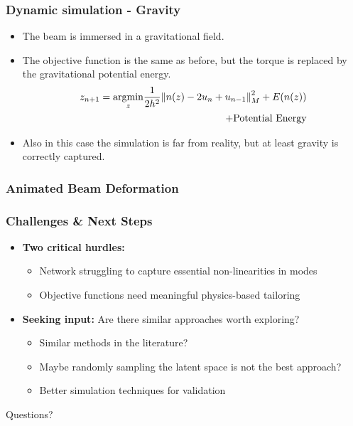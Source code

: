 \documentclass{beamer}
\DeclareMathOperator{\argmin}{argmin}
\begin{document}
\begin{frame}
    \frametitle{Dynamic simulation - Gravity}
    \begin{itemize}
        \item The beam is immersed in a gravitational field.
        \item The objective function is the same as before, but the torque is replaced by the gravitational potential energy.
        \[
            \begin{split}
                z_{n+1} = \underset{z}{\argmin}  \frac{1}{2h^2} \norm{n(z) - 2u_n + u_{n-1}}^2_M + E(n(z)) \\ + \text{Potential Energy}
            \end{split}
        \]
        \item Also in this case the simulation is far from reality, but at least gravity is correctly captured.
    \end{itemize}
\end{frame}

\begin{frame}
    \frametitle{Animated Beam Deformation}
    \begin{center}
    \end{center}
\end{frame}


\begin{frame}
    \frametitle{Challenges \& Next Steps}
        \begin{itemize}
            \item \textbf{Two critical hurdles:}
                  \begin{itemize}
                    \item Network struggling to capture essential non-linearities in modes
                    \item Objective functions need meaningful physics-based tailoring
                  \end{itemize}
            \item \textbf{Seeking input:} Are there similar approaches worth exploring?
                  \begin{itemize}
                    \item Similar methods in the literature?
                    \item Maybe randomly sampling the latent space is not the best approach?
                    \item Better simulation techniques for validation
                  \end{itemize}
        \end{itemize}
\end{frame}

\begin{frame}
    \begin{center}
        \color{blue} \Huge{Questions?}
    \end{center}

\end{frame}
\end{document}
